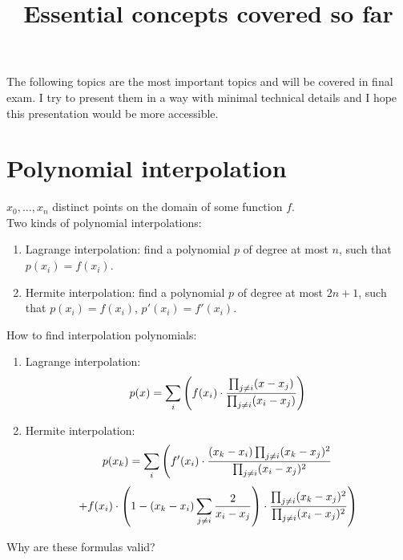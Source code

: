 \documentclass[20pt]{article} %
\title{Essential concepts covered so far}
\theoremstyle{break}
\begin{document}
\maketitle

The following topics are the most important topics and will be covered in final exam. I try to present them in a way with minimal technical details and I hope this presentation would be more accessible.

  \newpage

  \section{Polynomial interpolation}

  $x_0, \dots, x_n$ distinct points on the domain of some function $f$.\\
  
  Two kinds of polynomial interpolations:
  \begin{enumerate}
  \item Lagrange interpolation: find a polynomial $p$ of degree at most $n$, such that $p(x_i)=f(x_i)$.
  \item Hermite interpolation: find a polynomial $p$ of degree at most $2n+1$, such that $p(x_i)=f(x_i)$, $p'(x_i)=f'(x_i)$.
  \end{enumerate}

  \newpage

  How to find interpolation polynomials:

  \begin{enumerate}
  \item Lagrange interpolation:
    \[p(x)=\sum_i\left( f(x_i)\cdot {\prod_{j\not=i}(x-x_j)\over \prod_{j\not=i}(x_i-x_j)}\right)\]
  \item Hermite interpolation:
    \[p(x_k)=\sum_i\left( f'(x_i)\cdot {(x_k-x_i)\prod_{j\not=i}(x_k-x_j)^2\over \prod_{j\not=i}(x_i-x_j)^2}\right. \]
  \[\left. +f(x_i)\cdot \left(1-(x_k-x_i)\sum_{j\not=i}{2\over x_i-x_j}\right)\cdot {\prod_{j\not=i}(x_k-x_j)^2\over \prod_{j\not=i}(x_i-x_j)^2} \right)\]
\end{enumerate}

\newpage

Why are these formulas valid?
\end{document}
